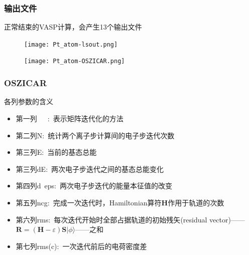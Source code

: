 \frame
{
	\frametitle{输出文件}
正常结束的\textrm{VASP}计算，会产生13个输出文件%
\begin{figure}[h!]
\centering
\vskip -2pt
\texttt{[image: Pt\_atom-lsout.png]}
\caption{\fontsize{6.2pt}{5.2pt}}%
\label{Pt_atom:lsout}
\end{figure}

{\fontsize{7.5pt}{5.2pt}}%
\begin{figure}[h!]
\centering
\texttt{[image: Pt\_atom-OSZICAR.png]}
\caption{\fontsize{6.2pt}{5.2pt}}%
\label{Pt_atom:OSZICAR}
\end{figure}
}

\frame
{
	\frametitle{\textrm{OSZICAR}}
	各列参数的含义
\begin{itemize}
	\item 第一列~~~:~表示矩阵迭代化的方法
	\item 第二列\textrm{N}:~统计两个离子步计算间的电子步迭代次数
	\item 第三列\textrm{E}:~当前的基态总能
	\item 第三列\textrm{dE}:~两次电子步迭代之间的基态总能变化
	\item 第四列\textrm{d~eps}:~两次电子步迭代的能量本征值的改变%
	\item 第五列\textrm{ncg}:~完成一次迭代时，\textrm{Hamiltonian}算符\textbf{H}作用于轨道的次数~
	\item 第六列\textrm{rms}:~每次迭代开始时全部占据轨道的初始残矢\textrm{(residual vector)}——$\mathbf{R}=(\mathbf{H}-\varepsilon)\mathbf{S}|\phi\rangle$——之和\\{\fontsize{7.0pt}{5.2pt}\selectfont{该值表明轨道的收敛情形的优劣}}
	\item 第七列\textrm{rms(c)}:~一次迭代前后的电荷密度差
\end{itemize}
}

